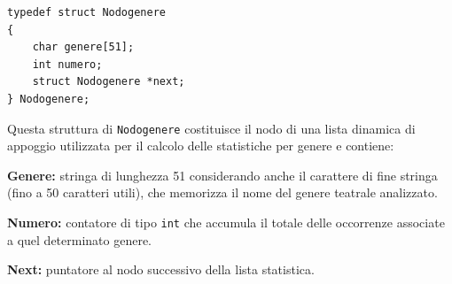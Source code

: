 \documentclass[11pt,a4paper,oneside,openany]{book}
\newenvironment{listacomp}{%
    \small
    \begin{list}{\textendash}{%
        \setlength{\topsep}{2pt}%
        \setlength{\partopsep}{0pt}%
        \setlength{\itemsep}{1pt}%
        \setlength{\parsep}{0pt}%
        \setlength{\leftmargin}{1.2em}%
    }%
}{%
    \end{list}%
}
\begin{document}
\vspace{0.2cm}
\begin{samepage}
\begin{lstlisting}[caption={Definizione della struttura Nodogenere}]
typedef struct Nodogenere
{
    char genere[51];
    int numero;
    struct Nodogenere *next;
} Nodogenere;
\end{lstlisting}
Questa struttura di \texttt{Nodogenere} costituisce il nodo di una lista dinamica di appoggio utilizzata per il calcolo delle statistiche per genere e contiene:
\begin{listacomp}
    \item \textbf{Genere:} stringa di lunghezza 51 considerando anche il carattere di fine stringa (fino a 50 caratteri utili), che memorizza il nome del genere teatrale analizzato.
    \item \textbf{Numero:} contatore di tipo \texttt{int} che accumula il totale delle occorrenze associate a quel determinato genere.
    \item \textbf{Next:} puntatore al nodo successivo della lista statistica.
\end{listacomp}
\end{samepage}

\end{document}
